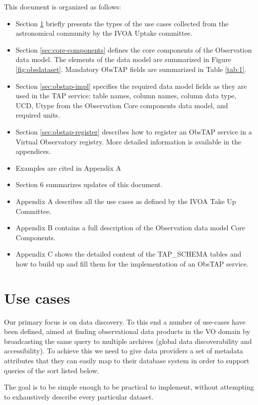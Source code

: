 \documentclass[11pt,a4paper]{ivoa}
\begin{document}
This document is organized as follows:
\begin{itemize}
\item Section \ref{sec:use-cases} briefly presents the types of the use cases collected from the astronomical
community by the IVOA Uptake committee.
\item Section \ref{sec:core-components} defines the core components of the Observation data model. The elements of the data
model are summarized in Figure \ref{fig:obsdataset}. Mandatory ObsTAP fields are summarized in Table \ref{tab:1}.
\item Section \ref{sec:obstap-impl} specifies the required data model fields as they are used in the TAP service: table
names, column names, column data type, UCD, Utype from the Observation Core components data model, and required units.
\item Section \ref{sec:obstap-register} describes how to register an ObsTAP service in a Virtual Observatory registry.
More detailed information is available in the appendices.
\item Examples are cited in Appendix A
\item Section 6 summarizes updates of this document.
\item Appendix A describes all the use cases as defined by the IVOA Take Up Committee.
\item Appendix B contains a full description of the Observation data model Core Components.
\item Appendix C shows the detailed content of the TAP\_SCHEMA tables and how to build up and fill them for the
implementation of an ObsTAP service.
\end{itemize}

\section[Use cases]{Use cases}
\label{sec:use-cases}Our primary focus is on data discovery.  To this end a number of use-cases have been defined,
aimed at finding observational data products in the VO domain by broadcasting the same query to multiple archives
(global data discoverability and accessibility).  To achieve this we need to give data providers a set of metadata
attributes that they can easily map to their database system in order to support queries of the sort listed below.

The goal is to be simple enough to be practical to implement, without attempting to exhaustively describe every
particular dataset.
\end{document}
